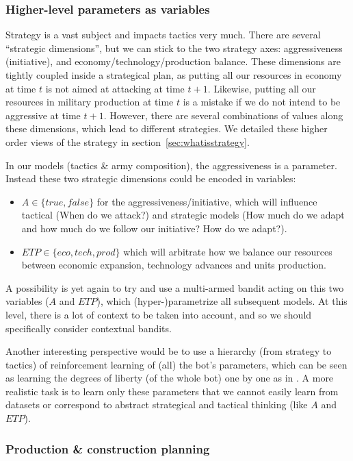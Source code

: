 \subsubsection{Higher-level parameters as variables}

Strategy is a vast subject and impacts tactics very much. There are several ``strategic dimensions'', but we can stick to the two strategy axes: aggressiveness (initiative), and economy/technology/production balance. 
These dimensions are tightly coupled inside a strategical plan, as putting all our resources in economy at time $t$ is not aimed at attacking at time $t+1$. Likewise, putting all our resources in military production at time $t$ is a mistake if we do not intend to be aggressive at time $t+1$. However, there are several combinations of values along these dimensions, which lead to different strategies. We detailed these higher order views of the strategy in section~\ref{sec:whatisstrategy}. 

In our models (tactics \& army composition), the aggressiveness is a parameter. Instead these two strategic dimensions could be encoded in variables:
\begin{itemize}
    \item $A \in \{true,false\}$ for the aggressiveness/initiative, which will influence tactical (When do we attack?) and strategic models (How much do we adapt and how much do we follow our initiative? How do we adapt?).
    \item $ETP \in \{eco,tech,prod\}$ which will arbitrate how we balance our resources between economic expansion, technology advances and units production.
\end{itemize}
A possibility is yet again to try and use a multi-armed bandit acting on this two variables ($A$ and $ETP$), which (hyper-)parametrize all subsequent models. At this level, there is a lot of context to be taken into account, and so we should specifically consider contextual bandits.

Another interesting perspective would be to use a hierarchy (from strategy to tactics) of reinforcement learning of (all) the bot's parameters, which can be seen as learning the degrees of liberty (of the whole bot) one by one as in \citep{baranes2009}. A more realistic task is to learn only these parameters that we cannot easily learn from datasets or correspond to abstract strategical and tactical thinking (like $A$ and $ETP$).

\subsubsection{Production \& construction planning}

